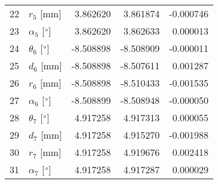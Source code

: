 \documentclass{standalone}%
\begin{document}
\begin{tabular}{llrrr}
22 &              $r_{5}$ [mm] &  3.862620 &   3.861874 &  -0.000746 \\
23 &  $\alpha_{5}$ [$\degree$] &  3.862620 &   3.862633 &   0.000013 \\
24 &  $\theta_{6}$ [$\degree$] & -8.508898 &  -8.508909 &  -0.000011 \\
25 &              $d_{6}$ [mm] & -8.508898 &  -8.507611 &   0.001287 \\
26 &              $r_{6}$ [mm] & -8.508898 &  -8.510433 &  -0.001535 \\
27 &  $\alpha_{6}$ [$\degree$] & -8.508899 &  -8.508948 &  -0.000050 \\
28 &  $\theta_{7}$ [$\degree$] &  4.917258 &   4.917313 &   0.000055 \\
29 &              $d_{7}$ [mm] &  4.917258 &   4.915270 &  -0.001988 \\
30 &              $r_{7}$ [mm] &  4.917258 &   4.919676 &   0.002418 \\
31 &  $\alpha_{7}$ [$\degree$] &  4.917258 &   4.917287 &   0.000029 \\
\bottomrule
\end{tabular}
%
\end{document}
